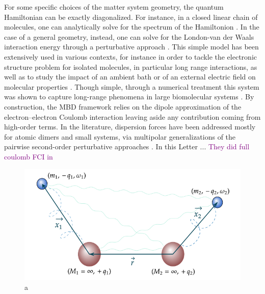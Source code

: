 \documentclass[reprint, amsmath, amssymb, aps]{revtex4-2}
\begin{document}
    For some specific choices of the matter system geometry, the quantum Hamiltonian can be exactly diagonalized. For instance, in a closed linear chain of molecules, one can analytically solve for the spectrum of the Hamiltonion \cite{doi:10.1063/1.1743992}. In the case of a general geometry, instead, one can solve for the London-van der Waals interaction energy through a perturbative approach \cite{doi:10.1063/1.1743991}.
    This simple model has been extensively used in various contexts, for instance in order to tackle the electronic structure problem for isolated molecules, in particular long range interactions, as well as to study the impact of an ambient bath or of an external electric field on molecular properties \cite{Karimpour_2022, karimpour2021comprehensive}.
    Though simple, through a numerical treatment this system was shown to capture long-range phenomena in large biomolecular systems \cite{https://doi.org/10.48550/arxiv.2205.11549}. By construction, the MBD framework relies on the dipole approximation of the electron–electron Coulomb interaction leaving aside any contribution coming from high-order terms. In the literature, dispersion forces have been addressed mostly for atomic dimers and small systems, via multipolar generalizations of the pairwise second-order perturbative approaches \cite{massa2021beyond,massa2021many,becke2006simple,becke2006exchange}.
    In this Letter ...
    \textcolor{purple}{They did full coulomb FCI in \cite{sadhukhan2016quantum}}

    \begin{figure}
    \label{fig:qdos}
        \includegraphics[scale=0.35]{figures/qdos.png}
        \caption{a}
    \end{figure}
\end{document}
